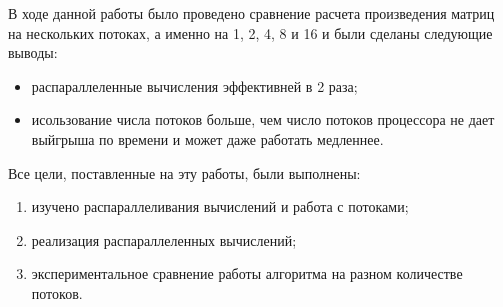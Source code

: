 \newpage
{}

В ходе данной работы было проведено сравнение расчета произведения матриц на нескольких потоках,
а именно на 1, 2, 4, 8 и 16 и были сделаны следующие выводы:

\begin{itemize}
    \item распараллеленные вычисления эффективней в 2 раза;
    \item исользование числа потоков больше, чем число потоков процессора не дает
        выйгрыша по времени и может даже работать медленнее.
\end{itemize}

Все цели, поставленные на эту работы, были выполнены:

\begin{enumerate}
    \item изучено распараллеливания вычислений и работа с потоками;
    \item реализация распараллеленных вычислений;
    \item экспериментальное сравнение работы алгоритма на разном количестве потоков.
\end{enumerate}
